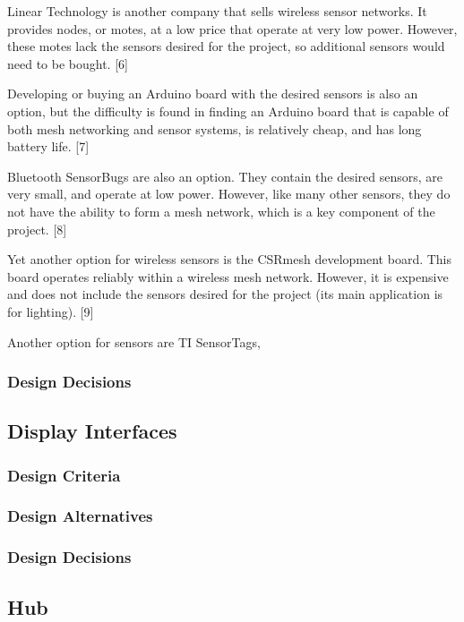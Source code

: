 \documentclass[ppfs.tex]{template/subfiles}
\begin{document}
Linear Technology is another company that sells wireless sensor networks. It provides nodes, or motes, at a low price that operate at very low power. However, these motes lack the sensors desired for the project, so additional sensors would need to be bought. [6]

Developing or buying an Arduino board with the desired sensors is also an option, but the difficulty is found in finding an Arduino board that is capable of both mesh networking and sensor systems, is relatively cheap, and has long battery life. [7] %

Bluetooth SensorBugs are also an option. They contain the desired sensors, are very small, and operate at low power. However, like many other sensors, they do not have the ability to form a mesh network, which is a key component of the project. [8]

Yet another option for wireless sensors is the CSRmesh development board. This board operates reliably within a wireless mesh network. However, it is expensive and does not include the sensors desired for the project (its main application is for lighting). [9]

Another option for sensors are TI SensorTags,

\subsubsection{Design Decisions}

\subsection{Display Interfaces}

\subsubsection{Design Criteria}

\subsubsection{Design Alternatives}

\subsubsection{Design Decisions}

\subsection{Hub}
\end{document}
